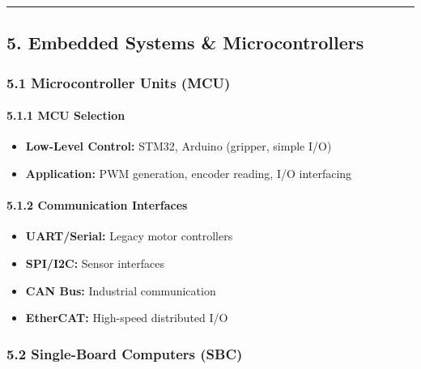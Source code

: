 \documentclass[
]{article}
\providecommand{\tightlist}{%
  \setlength{\itemsep}{0pt}\setlength{\parskip}{0pt}}
\begin{document}
\begin{center}\rule{0.5\linewidth}{0.5pt}\end{center}

\hypertarget{embedded-systems-microcontrollers}{%
\subsection{5. Embedded Systems \&
Microcontrollers}\label{embedded-systems-microcontrollers}}

\hypertarget{microcontroller-units-mcu}{%
\subsubsection{5.1 Microcontroller Units
(MCU)}\label{microcontroller-units-mcu}}

\hypertarget{mcu-selection}{%
\paragraph{5.1.1 MCU Selection}\label{mcu-selection}}

\begin{itemize}
\tightlist
\item
  \textbf{Low-Level Control:} STM32, Arduino (gripper, simple I/O)
\item
  \textbf{Application:} PWM generation, encoder reading, I/O interfacing
\end{itemize}

\hypertarget{communication-interfaces}{%
\paragraph{5.1.2 Communication
Interfaces}\label{communication-interfaces}}

\begin{itemize}
\tightlist
\item
  \textbf{UART/Serial:} Legacy motor controllers
\item
  \textbf{SPI/I2C:} Sensor interfaces
\item
  \textbf{CAN Bus:} Industrial communication
\item
  \textbf{EtherCAT:} High-speed distributed I/O
\end{itemize}

\hypertarget{single-board-computers-sbc}{%
\subsubsection{5.2 Single-Board Computers
(SBC)}\label{single-board-computers-sbc}}
\end{document}
